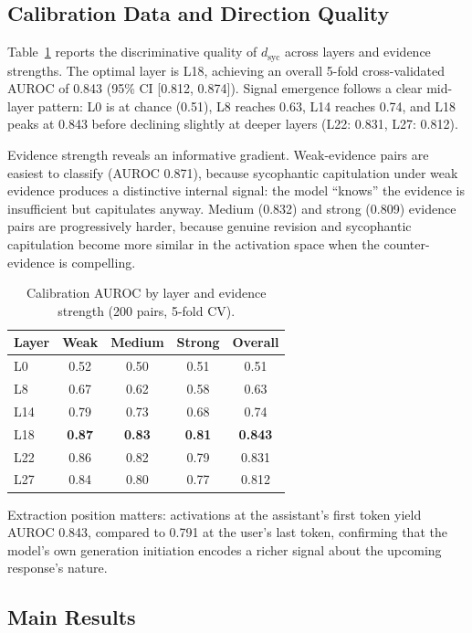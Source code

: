 \documentclass[11pt,a4paper]{article}
\newcommand{\dsyc}{$d_{\text{syc}}$}
\begin{document}
\subsection{Calibration Data and Direction Quality}
\label{sec:calibration}

Table~\ref{tab:calibration} reports the discriminative quality of \dsyc{} across layers and evidence strengths. The optimal layer is L18, achieving an overall 5-fold cross-validated AUROC of 0.843 (95\% CI [0.812, 0.874]). Signal emergence follows a clear mid-layer pattern: L0 is at chance (0.51), L8 reaches 0.63, L14 reaches 0.74, and L18 peaks at 0.843 before declining slightly at deeper layers (L22: 0.831, L27: 0.812).

Evidence strength reveals an informative gradient. Weak-evidence pairs are easiest to classify (AUROC 0.871), because sycophantic capitulation under weak evidence produces a distinctive internal signal: the model ``knows'' the evidence is insufficient but capitulates anyway. Medium (0.832) and strong (0.809) evidence pairs are progressively harder, because genuine revision and sycophantic capitulation become more similar in the activation space when the counter-evidence is compelling.

\begin{table}[t]
\centering
\caption{Calibration AUROC by layer and evidence strength (200 pairs, 5-fold CV).}
\label{tab:calibration}
\small
\begin{tabular}{lcccc}
\toprule
Layer & Weak & Medium & Strong & Overall \\
\midrule
L0  & 0.52 & 0.50 & 0.51 & 0.51 \\
L8  & 0.67 & 0.62 & 0.58 & 0.63 \\
L14 & 0.79 & 0.73 & 0.68 & 0.74 \\
L18 & \textbf{0.87} & \textbf{0.83} & \textbf{0.81} & \textbf{0.843} \\
L22 & 0.86 & 0.82 & 0.79 & 0.831 \\
L27 & 0.84 & 0.80 & 0.77 & 0.812 \\
\bottomrule
\end{tabular}
\end{table}

Extraction position matters: activations at the assistant's first token yield AUROC 0.843, compared to 0.791 at the user's last token, confirming that the model's own generation initiation encodes a richer signal about the upcoming response's nature.

\subsection{Main Results}
\label{sec:main_results}
\end{document}
